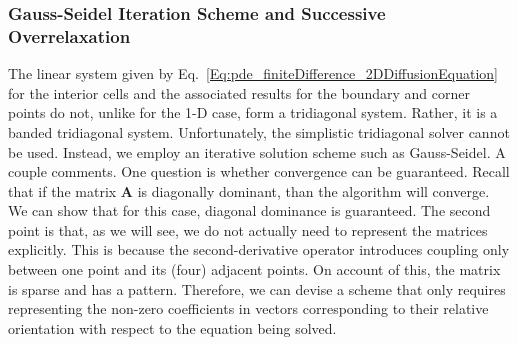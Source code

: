 



\subsubsection{Gauss-Seidel Iteration Scheme and Successive Overrelaxation}

The linear system given by Eq.~\eqref{Eq:pde_finiteDifference_2DDiffusionEquation} for the interior cells and the associated results for the boundary and corner points do not, unlike for the 1-D case, form a tridiagonal system. Rather, it is a banded tridiagonal system. Unfortunately, the simplistic tridiagonal solver cannot be used. Instead, we employ an iterative solution scheme such as Gauss-Seidel. A couple comments. One question is whether convergence can be guaranteed. Recall that if the matrix $\mathbf{A}$ is diagonally dominant, than the algorithm will converge. We can show that for this case, diagonal dominance is guaranteed. The second point is that, as we will see, we do not actually need to represent the matrices explicitly. This is because the second-derivative operator introduces coupling only between one point and its (four) adjacent points. On account of this, the matrix is sparse and has a pattern. Therefore, we can devise a scheme that only requires representing the non-zero coefficients in vectors corresponding to their relative orientation with respect to the equation being solved.

